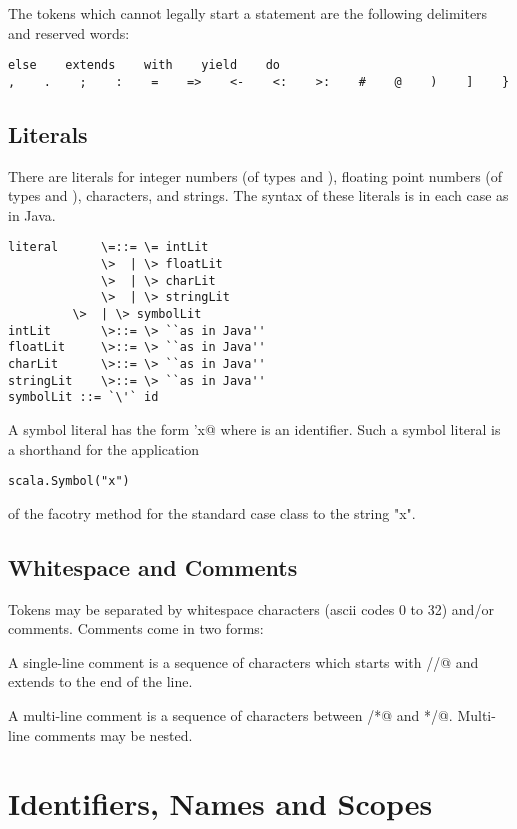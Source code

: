\documentclass[11pt]{report}
\begin{document}
The tokens which cannot legally start a statement
are the following delimiters and reserved words:
\begin{verbatim}
else    extends    with    yield    do
,    .    ;    :    =    =>    <-    <:    >:    #    @    )    ]    }
\end{verbatim}

\section{Literals}

There are literals for integer numbers (of types \verb@Int@ and \verb@Long@),
floating point numbers (of types \verb@Float@ and \verb@Double@), characters, and
strings.  The syntax of these literals is in each case as in Java.

\syntax\begin{verbatim}
literal      \=::= \= intLit
             \>  | \> floatLit
             \>  | \> charLit
             \>  | \> stringLit
	     \>  | \> symbolLit
intLit       \>::= \> ``as in Java''
floatLit     \>::= \> ``as in Java''
charLit      \>::= \> ``as in Java''
stringLit    \>::= \> ``as in Java''
symbolLit ::= `\'` id
\end{verbatim}

A symbol literal has the form \verb@'x@ where \verb@x@ is an identifier.
Such a symbol literal is a  shorthand for the application
\begin{verbatim}
scala.Symbol("x")
\end{verbatim}
of the facotry method for the standard case class \verb@Symbol@ to the string "x".

\section{Whitespace and Comments}

Tokens may be separated by whitespace characters (ascii codes 0 to 32)
and/or comments. Comments come in two forms:

A single-line comment is a sequence of characters which starts with
\verb@//@ and extends to the end of the line.

A multi-line comment is a sequence of characters between \verb@/*@ and
\verb@*/@. Multi-line comments may be nested.


\chapter{\label{sec:names}Identifiers, Names and Scopes}
\end{document}
